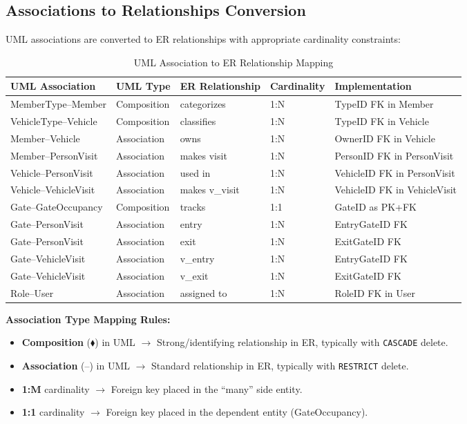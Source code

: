 \documentclass[a4paper, 12pt]{article}
\begin{document}
\subsection{Associations to Relationships Conversion}

UML associations are converted to ER relationships with appropriate cardinality constraints:

\begin{table}[H]
\centering
\caption{UML Association to ER Relationship Mapping}
\label{tab:assoc-to-rel}
\small
\begin{tabularx}{\textwidth}{l l l l X}
\toprule
\textbf{UML Association} & \textbf{UML Type} & \textbf{ER Relationship} & \textbf{Cardinality} & \textbf{Implementation} \\
\midrule
MemberType--Member & Composition & categorizes & 1:N & TypeID FK in Member \\
VehicleType--Vehicle & Composition & classifies & 1:N & TypeID FK in Vehicle \\
Member--Vehicle & Association & owns & 1:N & OwnerID FK in Vehicle \\
Member--PersonVisit & Association & makes visit & 1:N & PersonID FK in PersonVisit \\
Vehicle--PersonVisit & Association & used in & 1:N & VehicleID FK in PersonVisit \\
Vehicle--VehicleVisit & Association & makes v\_visit & 1:N & VehicleID FK in VehicleVisit \\
Gate--GateOccupancy & Composition & tracks & 1:1 & GateID as PK+FK \\
Gate--PersonVisit & Association & entry & 1:N & EntryGateID FK \\
Gate--PersonVisit & Association & exit & 1:N & ExitGateID FK \\
Gate--VehicleVisit & Association & v\_entry & 1:N & EntryGateID FK \\
Gate--VehicleVisit & Association & v\_exit & 1:N & ExitGateID FK \\
Role--User & Association & assigned to & 1:N & RoleID FK in User \\
\bottomrule
\end{tabularx}
\end{table}

\textbf{Association Type Mapping Rules:}
\begin{itemize}[leftmargin=*, nosep]
    \item \textbf{Composition} ($\blacklozenge$) in UML $\rightarrow$ Strong/identifying relationship in ER, typically with \texttt{CASCADE} delete.
    \item \textbf{Association} (--) in UML $\rightarrow$ Standard relationship in ER, typically with \texttt{RESTRICT} delete.
    \item \textbf{1:M} cardinality $\rightarrow$ Foreign key placed in the ``many'' side entity.
    \item \textbf{1:1} cardinality $\rightarrow$ Foreign key placed in the dependent entity (GateOccupancy).
\end{itemize}
\end{document}
